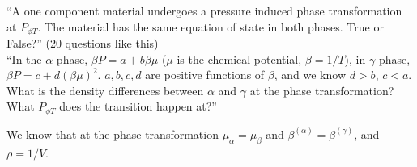 \documentclass[12pt]{article}
\begin{document}
``A one component material undergoes a pressure induced phase transformation at $P_{\phi T}$.  The material has the same equation of state in both phases.  True or False?'' (20 questions like this)\\

``In the $\alpha$ phase, $\beta P = a + b \beta \mu$ ($\mu$ is the chemical potential, $\beta = 1/T$), in $\gamma$ phase, $\beta P = c + d (\beta \mu)^2$.  $a,b,c,d$ are positive functions of $\beta$, and we know $d > b$, $c < a$.  What is the density differences between $\alpha$ and $\gamma$ at the phase transformation?  What $P_{\phi T}$ does the transition happen at?''

 We know that at the phase transformation $\mu_\alpha = \mu_\beta$ and $\beta^{(\alpha)} = \beta^{(\gamma)}$, and $\rho = 1/V$.

\end{document}
